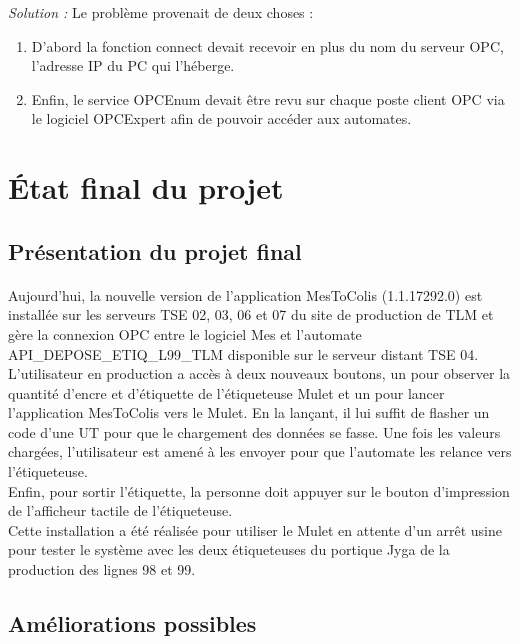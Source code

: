 \documentclass[a4paper,12pt]{extarticle}
\begin{document}
\emph{Solution :} Le problème provenait de deux choses : 

\begin{enumerate}[-]
	\item D'abord la fonction connect devait recevoir en plus du nom du serveur OPC, l'adresse IP du PC qui l'héberge.
	\item Enfin, le service OPCEnum devait être revu sur chaque poste client OPC via le logiciel OPCExpert afin de pouvoir accéder aux automates.
\end{enumerate}
	
	\clearpage
	
	\section{État final du projet}
		
	\subsection{Présentation du projet final}
		\paragraph{}
	
	Aujourd’hui, la nouvelle version de l’application MesToColis (1.1.17292.0) est installée sur les serveurs TSE 02, 03, 06 et 07 du site de production de TLM et gère la connexion OPC entre le logiciel Mes et l’automate\\
API\_DEPOSE\_ETIQ\_L99\_TLM disponible sur le serveur distant TSE 04. L’utilisateur en production a accès à deux nouveaux boutons, un pour observer la quantité d'encre et d’étiquette de l’étiqueteuse Mulet et un pour lancer l’application MesToColis vers le Mulet. En la lançant, il lui suffit de flasher un code d’une UT pour que le chargement des données se fasse. Une fois les valeurs chargées, l’utilisateur est amené à les envoyer pour que l’automate les relance vers l’étiqueteuse.\\
Enfin, pour sortir l’étiquette, la personne doit appuyer sur le bouton d’impression de l’afficheur tactile de l’étiqueteuse.\\
Cette installation a été réalisée pour utiliser le Mulet en attente d’un arrêt usine pour tester le système avec les deux étiqueteuses du portique Jyga de la production des lignes 98 et 99.
	
	\subsection{Améliorations possibles}
\end{document}
